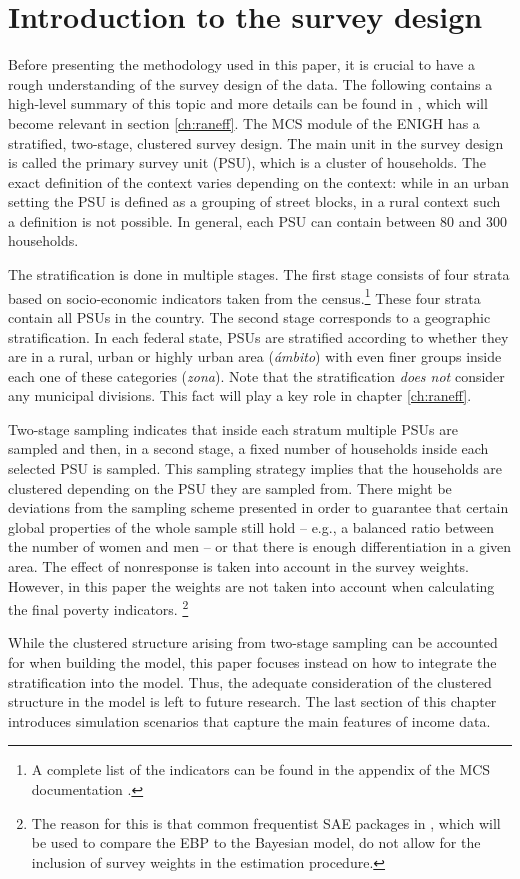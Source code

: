 \section{Introduction to the survey design}
\label{ch:design}

Before presenting the methodology used in this paper, it is crucial to have a rough understanding of the survey design of the data.
The following contains a high-level summary of this topic and more details can be found in \cite{inegi_modulo_2011}, which will become relevant in section \ref{ch:raneff}.
The MCS module of the ENIGH has a stratified, two-stage, clustered survey design.
The main unit in the survey design is called the primary survey unit (PSU), which is a cluster of households.
The exact definition of the context varies depending on the context:
while in an urban setting the PSU is defined as a grouping of street blocks, in a rural context such a definition is not possible.
In general, each PSU can contain between 80 and 300 households.

The stratification is done in multiple stages.
The first stage consists of four strata based on socio-economic indicators taken from the census.\footnote{A complete list of the indicators can be found in the appendix of the MCS documentation \citep{inegi_modulo_2011}.} These four strata contain all PSUs in the country.
The second stage corresponds to a geographic stratification.
In each federal state, PSUs are stratified according to whether they are in a rural, urban or highly urban area (\textit{ámbito}) with even finer groups inside each one of these categories (\textit{zona}).
Note that the stratification \textit{does not} consider any municipal divisions.
This fact will play a key role in chapter \ref{ch:raneff}.

Two-stage sampling indicates that inside each stratum multiple PSUs are sampled and then, in a second stage, a fixed number of households inside each selected PSU is sampled.
This sampling strategy implies that the households are clustered depending on the PSU they are sampled from.
There might be deviations from the sampling scheme presented in order to guarantee that certain global properties of the whole sample still hold – e.g., a balanced ratio between the number of women and men – or that there is enough differentiation in a given area.
The effect of nonresponse is taken into account in the survey weights.
However, in this paper the weights are not taken into account when calculating the final poverty indicators.
\footnote{The reason for this is that common frequentist SAE packages in , which will be used to compare the EBP to the Bayesian model, do not allow for the inclusion of survey weights in the estimation procedure.}

While the clustered structure arising from two-stage sampling can be accounted for when building the model, this paper focuses instead on how to integrate the stratification into the model.
Thus, the adequate consideration of the clustered structure in the model is left to future research.
The last section of this chapter introduces simulation scenarios that capture the main features of income data.



